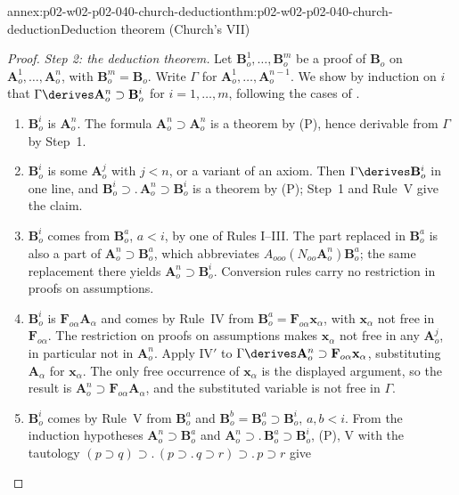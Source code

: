 \begin{annexitem}{annex:p02-w02-p02-040-church-deduction}{thm:p02-w02-p02-040-church-deduction}{Deduction theorem (Church's VII)}
\begin{proof}
\emph{Step 2: the deduction theorem.}  Let
\(\mathbf B^1_o,\ldots,\mathbf B^m_o\) be a proof of \(\mathbf B_o\) on
\(\mathbf A^1_o,\ldots,\mathbf A^n_o\), with \(\mathbf B^m_o=\mathbf B_o\).
Write \(\Gamma\) for \(\mathbf A^1_o,\ldots,\mathbf A^{n-1}_o\).  We show by
induction on \(i\) that
\(\Gamma\derives\mathbf A^n_o\supset\mathbf B^i_o\) for \(i=1,\ldots,m\),
following the cases of \cite[\S5, p.~63]{Church1940}.
\begin{enumerate}
 \item \(\mathbf B^i_o\) is \(\mathbf A^n_o\).  The formula
   \(\mathbf A^n_o\supset\mathbf A^n_o\) is a theorem by (P), hence derivable
   from \(\Gamma\) by Step~1.
 \item \(\mathbf B^i_o\) is some \(\mathbf A^j_o\) with \(j<n\), or a variant of
   an axiom.  Then \(\Gamma\derives\mathbf B^i_o\) in one line, and
   \(\mathbf B^i_o\supset.\,\mathbf A^n_o\supset\mathbf B^i_o\) is a theorem by
   (P); Step~1 and Rule~V give the claim.
 \item \(\mathbf B^i_o\) comes from \(\mathbf B^a_o\), \(a<i\), by one of
   Rules I--III.  The part replaced in \(\mathbf B^a_o\) is also a part of
   \(\mathbf A^n_o\supset\mathbf B^a_o\), which abbreviates
   \(A_{ooo}(N_{oo}\mathbf A^n_o)\mathbf B^a_o\); the same replacement
   there yields \(\mathbf A^n_o\supset\mathbf B^i_o\).  Conversion rules carry
   no restriction in proofs on assumptions.
 \item \(\mathbf B^i_o\) is \(\mathbf F_{o\alpha}\mathbf A_\alpha\) and comes by
   Rule~IV from \(\mathbf B^a_o=\mathbf F_{o\alpha}\mathbf x_\alpha\), with
   \(\mathbf x_\alpha\) not free in \(\mathbf F_{o\alpha}\).  The restriction on
   proofs on assumptions makes \(\mathbf x_\alpha\) not free in any
   \(\mathbf A^j_o\), in particular not in \(\mathbf A^n_o\).  Apply IV\('\)
   to \(\Gamma\derives\mathbf A^n_o\supset\mathbf F_{o\alpha}\mathbf x_\alpha\),
   substituting \(\mathbf A_\alpha\) for \(\mathbf x_\alpha\).  The only free
   occurrence of \(\mathbf x_\alpha\) is the displayed argument, so the result
   is \(\mathbf A^n_o\supset\mathbf F_{o\alpha}\mathbf A_\alpha\), and the
   substituted variable is not free in \(\Gamma\).
 \item \(\mathbf B^i_o\) comes by Rule~V from \(\mathbf B^a_o\) and
   \(\mathbf B^b_o=\mathbf B^a_o\supset\mathbf B^i_o\), \(a,b<i\).  From the
   induction hypotheses \(\mathbf A^n_o\supset\mathbf B^a_o\) and
   \(\mathbf A^n_o\supset.\,\mathbf B^a_o\supset\mathbf B^i_o\), (P), V with
   the tautology
   \((p\supset q)\supset.\,(p\supset.\,q\supset r)\supset.\,p\supset r\) give

\end{enumerate}
\end{proof}
\end{annexitem}
